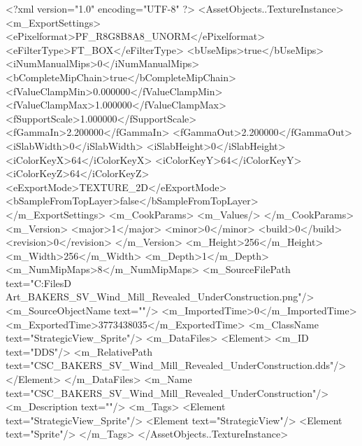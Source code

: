 <?xml version="1.0" encoding="UTF-8" ?>
<AssetObjects..TextureInstance>
	<m_ExportSettings>
		<ePixelformat>PF_R8G8B8A8_UNORM</ePixelformat>
		<eFilterType>FT_BOX</eFilterType>
		<bUseMips>true</bUseMips>
		<iNumManualMips>0</iNumManualMips>
		<bCompleteMipChain>true</bCompleteMipChain>
		<fValueClampMin>0.000000</fValueClampMin>
		<fValueClampMax>1.000000</fValueClampMax>
		<fSupportScale>1.000000</fSupportScale>
		<fGammaIn>2.200000</fGammaIn>
		<fGammaOut>2.200000</fGammaOut>
		<iSlabWidth>0</iSlabWidth>
		<iSlabHeight>0</iSlabHeight>
		<iColorKeyX>64</iColorKeyX>
		<iColorKeyY>64</iColorKeyY>
		<iColorKeyZ>64</iColorKeyZ>
		<eExportMode>TEXTURE_2D</eExportMode>
		<bSampleFromTopLayer>false</bSampleFromTopLayer>
	</m_ExportSettings>
	<m_CookParams>
		<m_Values/>
	</m_CookParams>
	<m_Version>
		<major>1</major>
		<minor>0</minor>
		<build>0</build>
		<revision>0</revision>
	</m_Version>
	<m_Height>256</m_Height>
	<m_Width>256</m_Width>
	<m_Depth>1</m_Depth>
	<m_NumMipMaps>8</m_NumMipMaps>
	<m_SourceFilePath text="C:\Users\Shadow\Desktop\Working Files\2D Art\Quarters\Bakers\StrategicView\CSC_BAKERS_SV_Wind_Mill_Revealed_UnderConstruction.png"/>
	<m_SourceObjectName text=""/>
	<m_ImportedTime>0</m_ImportedTime>
	<m_ExportedTime>3773438035</m_ExportedTime>
	<m_ClassName text="StrategicView_Sprite"/>
	<m_DataFiles>
		<Element>
			<m_ID text="DDS"/>
			<m_RelativePath text="CSC_BAKERS_SV_Wind_Mill_Revealed_UnderConstruction.dds"/>
		</Element>
	</m_DataFiles>
	<m_Name text="CSC_BAKERS_SV_Wind_Mill_Revealed_UnderConstruction"/>
	<m_Description text=""/>
	<m_Tags>
		<Element text="StrategicView_Sprite"/>
		<Element text="StrategicView"/>
		<Element text="Sprite"/>
	</m_Tags>
</AssetObjects..TextureInstance>

